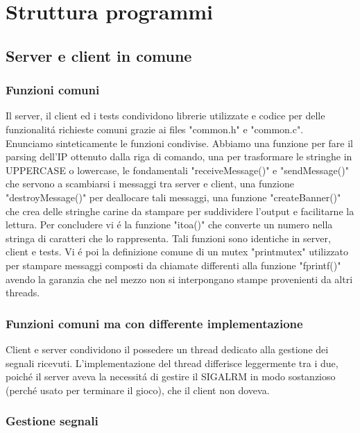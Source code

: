 \chapter{Struttura programmi}

\section{Server e client in comune}

\subsection{Funzioni comuni}

Il server, il client ed i tests condividono librerie utilizzate e codice per delle funzionalit\'a richieste comuni grazie ai files "common.h" e "common.c". 
\\
Enunciamo sinteticamente le funzioni condivise. Abbiamo una funzione per fare il parsing dell'IP ottenuto dalla riga di comando, una per trasformare le stringhe in UPPERCASE o lowercase, le fondamentali "receiveMessage()" e "sendMessage()" che servono a scambiarsi i messaggi tra server e client, una funzione "destroyMessage()" per deallocare tali messaggi, una funzione "createBanner()" che crea delle stringhe carine da stampare per suddividere l'output e facilitarne la lettura. Per concludere vi \'e la funzione "itoa()" che converte un numero nella stringa di caratteri che lo rappresenta. Tali funzioni sono identiche in server, client e tests. Vi \'e poi la definizione comune di un mutex "printmutex" utilizzato per stampare messaggi composti da chiamate differenti alla funzione "fprintf()" avendo la garanzia che nel mezzo non si interpongano stampe provenienti da altri threads.
 
 \subsection{Funzioni comuni ma con differente implementazione}

 Client e server condividono il possedere un thread dedicato alla gestione dei segnali ricevuti. L'implementazione del thread differisce leggermente tra i due, poich\'e il server aveva la necessit\'a di gestire il SIGALRM in modo sostanzioso (perch\'e usato per terminare il gioco), che il client non doveva.
  
\subsection{Gestione segnali}

